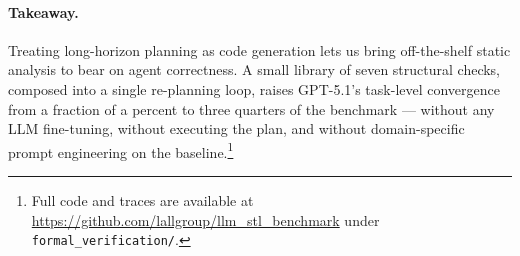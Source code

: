 \paragraph{Takeaway.}
Treating long-horizon planning as code generation lets us bring
off-the-shelf static analysis to bear on agent correctness.  A small library
of seven structural checks, composed into a single re-planning loop, raises
GPT-5.1's task-level convergence from a fraction of a percent to three
quarters of the benchmark --- without any LLM fine-tuning, without executing
the plan, and without domain-specific prompt engineering on the
baseline.\footnote{Full code and traces are available at
\url{https://github.com/lallgroup/llm_stl_benchmark} under
\texttt{formal\_verification/}.}
